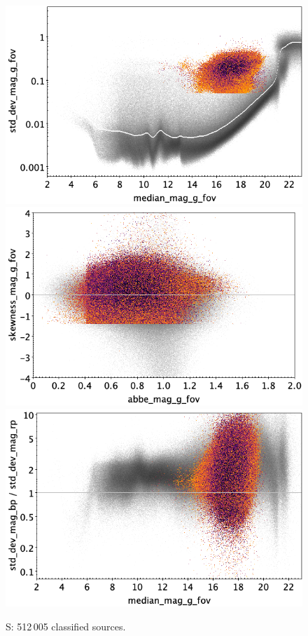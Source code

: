 \documentclass[longauth]{aa}
\begin{document}
\begin{appendix}
\begin{figure}
\hspace{2mm}
 \includegraphics[width=0.45\hsize]{figures/appendix/S_cls_msd.png} \\ %
\vspace{4mm}
 \includegraphics[width=0.45\hsize]{figures/appendix/S_cls_ask.png}  %
\hspace{2mm}
 \includegraphics[width=0.45\hsize]{figures/appendix/S_cls_msdr.png}  \\ %
\vspace{4mm}
 \caption{S: 512\,005 classified sources.}  
 \label{fig:app:S}
\end{figure}


\end{appendix}
\end{document}
